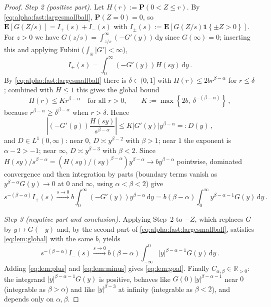 \documentclass{article}
\newcommand{\R}{\mathbb{R}}
\newcommand{\Rpp}{\R_{>0}}
\newcommand{\lcb}{\left\lbrace} %
\newcommand{\rcb}{\right\rbrace} %
\newcommand{\cb}[1]{\lcb #1 \rcb} %
\newcommand{\lab}{\left[} %
\newcommand{\rab}{\right]} %
\newcommand{\ab}[1]{\lab #1 \rab} %
\newcommand{\abOf}[1]{\!\ab{#1}} %
\newcommand{\lb}{\left(} %
\newcommand{\rb}{\right)} %
\newcommand{\br}[1]{\lb #1 \rb} %
\newcommand{\brOf}[1]{\!\br{#1}} %
\newcommand{\absOf}[1]{\left\vert #1 \right\vert} %
\renewcommand{\Pr}{\mathbf{P}} %
\newcommand{\Prof}[1]{\Pr(#1)}
\newcommand{\E}{\mathbf{E}} %
\newcommand{\EOf}[1]{\E\abOf{#1}}
\newcommand{\eqcm}{\,,} %
\newcommand{\eqfs}{\,.}
\newcommand{\dl}{\mathrm{d}} %
\begin{document}
\begin{proof}
    \emph{Step 2 (positive part).}
    Let $H(r):=\Prof{0<Z\le r}$. By \eqref{eq:alpha:fast:largesmallball}, $\Prof{Z=0}=0$, so
    $\EOf{G(Z/s)}=I_+(s)+I_-(s)$ with $I_\pm(s):=\EOf{G(Z/s)\mathbf 1\cb{\pm Z>0}}$.
    For $z>0$ we have $G(z/s)=\int_{z/s}^\infty(-G'(y))\,\dl y$ since $G(\infty)=0$; inserting this and applying Fubini ($\int_\R|G'|<\infty$),
    \begin{equation}
        I_+(s)=\int_0^\infty(-G'(y))H(sy)\,\dl y
        \eqfs
    \end{equation}
    By \eqref{eq:alpha:fast:largesmallball} there is $\delta\in(0,1]$ with $H(r)\le 2br^{\beta-\alpha}$ for $r\le\delta$; combined with $H\le1$ this gives the global bound
    \begin{equation}\label{eq:lem:global}
        H(r)\le Kr^{\beta-\alpha}
        \quad\text{for all }r>0,
        \qquad
        K:=\max\cb{2b,\ \delta^{-(\beta-\alpha)}}
        \eqcm
    \end{equation}
    because $r^{\beta-\alpha}\ge\delta^{\beta-\alpha}$ when $r>\delta$. Hence
    \begin{equation}
        \absOf{(-G'(y))\frac{H(sy)}{s^{\beta-\alpha}}}
        \le
        K|G'(y)|y^{\beta-\alpha}=:D(y)
        \eqcm
    \end{equation}
    and $D\in L^1(0,\infty)$: near $0$, $D\asymp y^{\beta-2}$ with $\beta>1$; near $1$ the exponent is $\alpha-2>-1$; near $\infty$, $D\asymp y^{\beta-3}$ with $\beta<2$. Since
    $H(sy)/s^{\beta-\alpha}=\brOf{H(sy)/(sy)^{\beta-\alpha}}y^{\beta-\alpha}\to by^{\beta-\alpha}$ pointwise, dominated convergence and then integration by parts (boundary terms vanish as $y^{\beta-\alpha}G(y)\to0$ at $0$ and $\infty$, using $\alpha<\beta<2$) give
    \begin{equation}\label{eq:lem:plus}
        s^{-(\beta-\alpha)} I_+(s)
        \xrightarrow{s\to0}
        b\int_0^\infty(-G'(y)) y^{\beta-\alpha}\,\dl y
        =
        b (\beta-\alpha)\int_0^\infty y^{\beta-\alpha-1} G(y)\,\dl y
        \eqfs
    \end{equation}
    
    \emph{Step 3 (negative part and conclusion).}
    Applying Step~2 to $-Z$, which replaces $G$ by $y\mapsto G(-y)$ and, by the second part of \eqref{eq:alpha:fast:largesmallball}, satisfies \eqref{eq:lem:global} with the same $b$, yields
    \begin{equation}\label{eq:lem:minus}
        s^{-(\beta-\alpha)} I_-(s)
        \xrightarrow{s\to0}
        b (\beta-\alpha)\int_{-\infty}^0 |y|^{\beta-\alpha-1} G(y)\,\dl y
        \eqfs
    \end{equation}
    Adding \eqref{eq:lem:plus} and \eqref{eq:lem:minus} gives \eqref{eq:lem:goal}. Finally $C_{\alpha,\beta}\in\Rpp$: the integrand $|y|^{\beta-\alpha-1}G(y)$ is positive, behaves like $G(0) |y|^{\beta-\alpha-1}$ near $0$ (integrable as $\beta>\alpha$) and like $|y|^{\beta-3}$ at infinity (integrable as $\beta<2$), and depends only on $\alpha,\beta$.
\end{proof}
\end{document}
